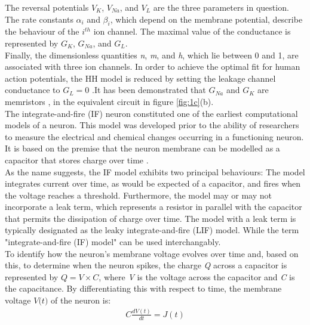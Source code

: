 \noindent The reversal potentials $V_K$, $V_{Na}$, and $V_L$ are the three parameters in question. The rate constants $\alpha_i$ and $\beta_i$, which depend on the membrane potential, describe the behaviour of the $i^{th}$ ion channel. The maximal value of the conductance is represented by $G_K$, $G_{Na}$, and $G_L$. \\

\noindent Finally, the dimensionless quantities \textit{n}, \textit{m}, and \textit{h}, which lie between 0 and 1, are associated with three ion channels. In order to achieve the optimal fit for human action potentials, the HH model is reduced by setting the leakage channel conductance to $G_L = 0$  \cite{noble1962modification}.It has been demonstrated that $G_{Na}$ and $G_K$ are memristors \cite{chua1976memristive}, in the equivalent circuit in figure \ref{fig:1c}(b). \\

\noindent The integrate-and-fire (IF) neuron \cite{lapicque1907louis} constituted one of the earliest computational models of a neuron. This model was developed prior to the ability of researchers to measure the electrical and chemical changes occurring in a functioning neuron. It is based on the premise that the neuron membrane can be modelled as a capacitor that stores charge over time \cite{abbott1999lapicque}.\\

\noindent As the name suggests, the IF model exhibits two principal behaviours: The model integrates current over time, as would be expected of a capacitor, and fires when the voltage reaches a threshold. Furthermore, the model may or may not incorporate a leak term, which represents a resistor in parallel with the capacitor that permits the dissipation of charge over time. The model with a leak term is typically designated as the leaky integrate-and-fire (LIF) model. While the term "integrate-and-fire (IF) model" can be used interchangably. \\

\noindent To identify how the neuron's membrane voltage evolves over time and, based on this, to determine when the neuron spikes, the charge \textit{Q} across a capacitor is represented by $Q = V \times C$, where \textit{V} is the voltage across the capacitor and \textit{C} is the capacitance. By differentiating this with respect to time, the membrane voltage $\textit{V(t)}$ of the neuron is:
\begin{align}
    C \frac{dV(t)}{dt} = J(t) \label{eq:1.6} 
\end{align}

